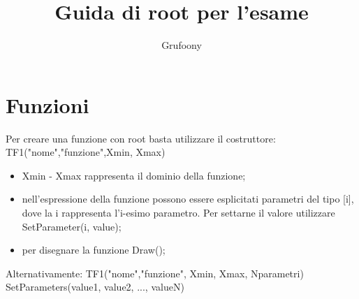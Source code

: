 \documentclass[11pt]{article}
\begin{document}
\title{\LARGE{\textbf{Guida di root per l'esame}}}
\author{\Large{Grufoony}}
\maketitle
\section{Funzioni}
Per creare una funzione con root basta utilizzare il costruttore:
TF1("nome","funzione",Xmin, Xmax)
\begin{itemize}
    \item Xmin - Xmax rappresenta il dominio della funzione;
    \item nell'espressione della funzione possono essere esplicitati parametri del tipo [i], dove la i rappresenta l'i-esimo parametro. Per settarne il valore utilizzare SetParameter(i, value);
    \item per disegnare la funzione Draw();
\end{itemize}
Alternativamente:
TF1("nome","funzione", Xmin, Xmax, Nparametri)
SetParameters(value1, value2, ..., valueN)
\end{document}

